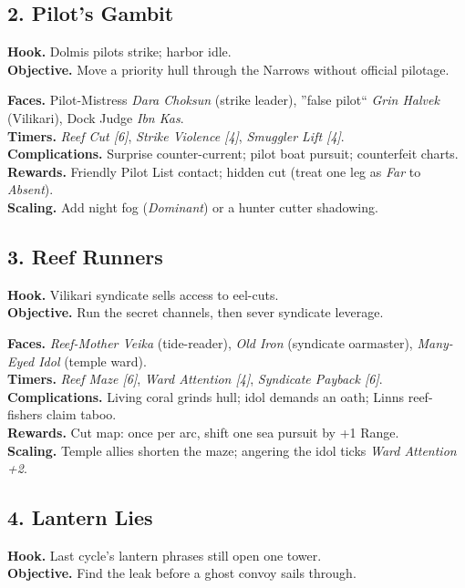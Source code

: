 \documentclass[11pt,oneside]{book}
\begin{document}
\begin{itemize}
\subsection*{2. Pilot's Gambit}
\textbf{Hook.} Dolmis pilots strike; harbor idle.\\
\textbf{Objective.} Move a priority hull through the Narrows without official pilotage.

\textbf{Faces.} Pilot-Mistress \emph{Dara Choksun} (strike leader), ''false pilot`` \emph{Grin Halvek} (Vilikari), Dock Judge \emph{Ibn Kas}.\\
\textbf{Timers.} \emph{Reef Cut [6]}, \emph{Strike Violence [4]}, \emph{Smuggler Lift [4]}.\\
\textbf{Complications.} Surprise counter-current; pilot boat pursuit; counterfeit charts.\\
\textbf{Rewards.} Friendly Pilot List contact; hidden cut (treat one leg as \emph{Far} to \emph{Absent}).\\
\textbf{Scaling.} Add night fog (\emph{Dominant}) or a hunter cutter shadowing.

\subsection*{3. Reef Runners}
\textbf{Hook.} Vilikari syndicate sells access to eel-cuts.\\
\textbf{Objective.} Run the secret channels, then sever syndicate leverage.

\textbf{Faces.} \emph{Reef-Mother Veika} (tide-reader), \emph{Old Iron} (syndicate oarmaster), \emph{Many-Eyed Idol} (temple ward).\\
\textbf{Timers.} \emph{Reef Maze [6]}, \emph{Ward Attention [4]}, \emph{Syndicate Payback [6]}.\\
\textbf{Complications.} Living coral grinds hull; idol demands an oath; Linns reef-fishers claim taboo.\\
\textbf{Rewards.} Cut map: once per arc, shift one sea pursuit by +1 Range.\\
\textbf{Scaling.} Temple allies shorten the maze; angering the idol ticks \emph{Ward Attention +2}.

\subsection*{4. Lantern Lies}
\textbf{Hook.} Last cycle's lantern phrases still open one tower.\\
\textbf{Objective.} Find the leak before a ghost convoy sails through.


\end{itemize}
\end{document}
